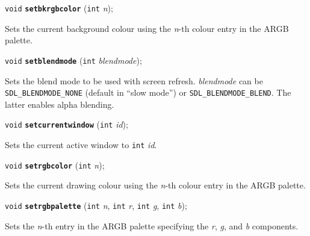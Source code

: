 \documentclass[a4paper,12pt]{article}
\newcommand{\V}{\texttt{void}}      %
\newcommand{\I}{\texttt{int}}       %
\newcommand{\func}[1]{\textbf{\texttt{#1}}}  %
\newcommand{\A}[1]{\emph{#1}}       %
\newcommand{\T}[1]{\texttt{#1}}     %
\newenvironment{bgi}
{ %
  \begin{snugshade}
}
{ %
  \end{snugshade}
}
\begin{document}

\label{sec:setbkrgbcolor}

\begin{bgi}
\V{} \func{setbkrgbcolor} (\I{} \A{n});
\end{bgi}

Sets the current background colour using the \A{n}-th colour entry in
the ARGB palette.


\label{sec:setblendmode}

\begin{bgi}
\V{} \func{setblendmode} (\I{} \A{blendmode});
\end{bgi}

Sets the blend mode to be used with screen refresh. \A{blendmode} can
be \T{SDL\_BLENDMODE\_NONE} (default in ``slow mode'') or
\T{SDL\_BLENDMODE\_BLEND}. The latter enables alpha blending.


\label{sec:setcurrentwindow}

\begin{bgi}
\V{} \func{setcurrentwindow} (\I{} \A{id});
\end{bgi}

Sets the current active window to \I{} \A{id}.


\label{sec:setrgbcolor}

\begin{bgi}
\V{} \func{setrgbcolor} (\I{} \A{n});
\end{bgi}

Sets the current drawing colour using the \A{n}-th colour entry in the
ARGB palette.


\label{sec:setrgbpalette}

\begin{bgi}
\V{} \func{setrgbpalette} (\I{} \A{n}, \I{} \A{r}, \I{} \A{g}, \I{} \A{b});
\end{bgi}

Sets the \A{n}-th entry in the ARGB palette specifying the \A{r},
\A{g}, and \A{b} components.
\end{document}
